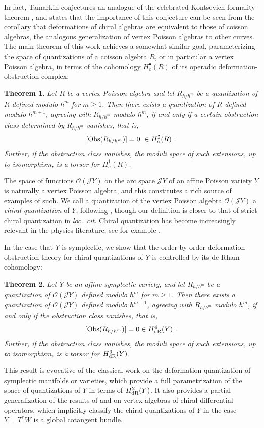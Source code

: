 \documentclass[11pt]{amsart}
\numberwithin{equation}{section}
\newtheorem{theo}{Theorem}[section]
\theoremstyle{definition}
\newcommand{\mc}{\mathcal}
\newcommand{\Obs}{{\textup{Obs}}}
\newcommand{\dR}{{\textup{dR}}}
\newcommand{\0}{{\textbf{0}}}
\begin{document}
In fact, Tamarkin conjectures an analogue of the celebrated Kontsevich formality theorem \cite{Kontsevich1997}, and states that the importance of this conjecture can be seen from the corollary that deformations of chiral algebras are equivalent to those of coisson algebras, the analogous generalization of vertex Poisson algebras to other curves. The main theorem of this work achieves a somewhat similar goal, parameterizing the space of quantizations of a coisson algebra $R$, or in particular a vertex Poisson algebra, in terms of the cohomology $H^\bullet_{c}(R)$ of its operadic deformation-obstruction complex:

\begin{theo}\label{introthm:order by order}
Let $R$ be a vertex Poisson algebra and let $R_{\hbar/\hbar^m}$ be a quantization of $R$ defined modulo $\hbar^m$ for $m\geq 1$. Then there exists a quantization of $R$ defined modulo $\hbar^{m+1}$, agreeing with $R_{\hbar/\hbar^m}$ modulo $\hbar^m$, if and only if a certain obstruction class determined by $R_{\hbar/\hbar^m}$ vanishes, that is,
\[
[\Obs(R_{\hbar/\hbar^m})]=0 \ \in H^2_{c}(R)~.
\]
Further, if the obstruction class vanishes, the moduli space of such extensions, up to isomorphism, is a torsor for $H^1_{c}(R)$.
\end{theo}

The space of functions $\mc O(\mc J Y)$ on the arc space $\mc J Y$ of an affine Poisson variety $Y$ is naturally a vertex Poisson algebra, and this constitutes a rich source of examples of such. We call a quantization of the vertex Poisson algebra $\mc O(\mc J Y)$ a \emph{chiral quantization} of $Y$, following \cite{Ar}, though our definition is closer to that of strict chiral quantization in \textit{loc.\ cit.} Chiral quantization has become increasingly relevant in the physics literature; see for example \cite{Beem:2017ooy}.

In the case that $Y$ is symplectic, we show that the order-by-order deformation-obstruction theory for chiral quantizations of $Y$ is controlled by its de Rham cohomology:
\begin{theo}\label{introthm:symplectic order by order}
	Let $Y$ be an affine symplectic variety, and let $R_{\hbar/\hbar^m}$ be a quantization of $\mc O(\mc J Y)$ defined modulo $\hbar^m$ for $m\geq 1$.
Then there exists a quantization of $\mc O(\mc J Y)$ defined modulo $\hbar^{m+1}$, agreeing with $R_{\hbar/\hbar^m}$ modulo $\hbar^m$, if and only if the obstruction class vanishes, that is,
	\[
	[\Obs(R_{\hbar/\hbar^m}) ]=0\in H^4_{\dR}(Y)~.
	\]
	Further, if the obstruction class vanishes, the moduli space of such extensions, up to isomorphism, is a torsor for $H^3_{\dR}(Y)$.
\end{theo}
This result is evocative of the classical work \cite{LecomteWilde83, Fedosov1994, Deligne, BeK} on the deformation quantization of symplectic manifolds or varieties, which provide a full parametrization of the space of quantizations of $Y$ in terms of $H^2_\dR(Y)$. It also provides a partial generalization of the results of \cite{GMS1, GMS2} and \cite{BD1} on vertex algebras of chiral differential operators, which implicitly classify the chiral quantizations of $Y$ in the case $Y=T^*W$ is a global cotangent bundle.
\end{document}
